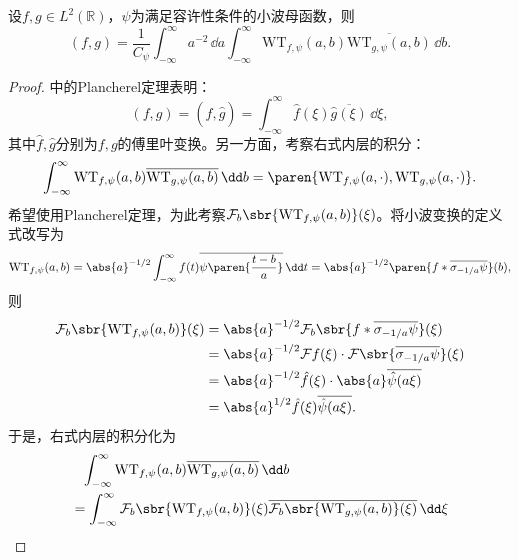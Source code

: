 \begin{theorem}[小波变换的Plancherel公式]
    设$f,g\in L^2(\mathbb{R})$，$\psi$为满足容许性条件的小波母函数，则
    \begin{equation}
        (f,g)=\frac{1}{C_{\psi}}\int_{-\infty}^{\infty}a^{-2}\,\dd a\int_{-\infty}^{\infty}\mathrm{WT}_{f,\psi}(a,b)\overline{\mathrm{WT}_{g,\psi}(a,b)}\,\dd b.
    \end{equation}
\end{theorem}
\begin{proof}
    中的Plancherel定理表明：
    \begin{equation}
        (f,g)=(\hat{f},\hat{g})=\int_{-\infty}^{\infty}\hat{f}(\xi)\overline{\hat{g}(\xi)}\,\dd\xi,
    \end{equation}
    其中$\hat{f},\hat{g}$分别为$f,g$的傅里叶变换。另一方面，考察右式内层的积分：
    \begin{equation}
        \int_{-\infty}^{\infty}\mathrm{WT}_{f,\psi}(a,b)\overline{\mathrm{WT}_{g,\psi}(a,b)}\,\dd b=\paren{\mathrm{WT}_{f,\psi}(a,\cdot),\mathrm{WT}_{g,\psi}(a,\cdot)}.
    \end{equation}
    希望使用Plancherel定理，为此考察$\mathcal{F}_b\sbr{\mathrm{WT}_{f,\psi}(a,b)}(\xi)$。将小波变换的定义式改写为
    \begin{equation}
        \mathrm{WT}_{f,\psi}(a,b)=\abs{a}^{-1/2}\int_{-\infty}^{\infty}f(t)\overline{\psi\paren{\frac{t-b}{a}}}\,\dd t=\abs{a}^{-1/2}\paren{f*\overline{\sigma_{-1/a}\psi}}(b),
    \end{equation}
    则
    \begin{align}
        \mathcal{F}_b\sbr{\mathrm{WT}_{f,\psi}(a,b)}(\xi)&=\abs{a}^{-1/2}\mathcal{F}_b\sbr{f*\overline{\sigma_{-1/a}\psi}}(\xi)\nonumber\\
        &=\abs{a}^{-1/2}\mathcal{F}f(\xi)\cdot\mathcal{F}\sbr{\overline{\sigma_{-1/a}\psi}}(\xi)\nonumber\\
        &=\abs{a}^{-1/2}\hat{f}(\xi)\cdot\abs{a}\overline{\hat{\psi}(a\xi)}\nonumber\\
        &=\abs{a}^{1/2}\hat{f}(\xi)\overline{\hat{\psi}(a\xi)}.
    \end{align}
    于是，右式内层的积分化为
    \begin{align}
        &\phantom{=}\int_{-\infty}^{\infty}\mathrm{WT}_{f,\psi}(a,b)\overline{\mathrm{WT}_{g,\psi}(a,b)}\,\dd b\nonumber\\
        &=\int_{-\infty}^{\infty}\mathcal{F}_b\sbr{\mathrm{WT}_{f,\psi}(a,b)}(\xi)\overline{\mathcal{F}_b\sbr{\mathrm{WT}_{g,\psi}(a,b)}(\xi)}\,\dd\xi\nonumber\\

\end{align}
\end{proof}
